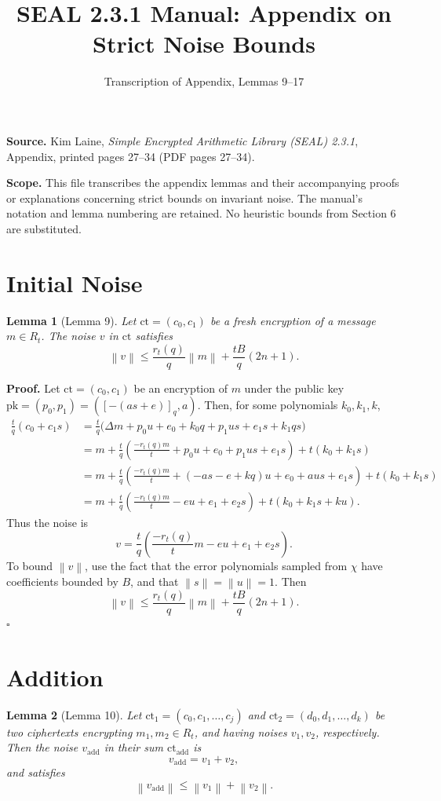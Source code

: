 \documentclass[11pt]{article}
\title{SEAL 2.3.1 Manual: Appendix on Strict Noise Bounds}
\author{Transcription of Appendix, Lemmas 9--17}
\date{}
\newtheorem{lemma}{Lemma}
\newcommand{\norm}[1]{\left\lVert #1\right\rVert}
\newcommand{\ct}{\mathrm{ct}}
\newcommand{\ctadd}{\mathrm{ct}_{\mathrm{add}}}
\newcommand{\vadd}{v_{\mathrm{add}}}
\begin{document}
\maketitle

\textbf{Source.} Kim Laine, \emph{Simple Encrypted Arithmetic Library (SEAL) 2.3.1},
Appendix, printed pages 27--34 (PDF pages 27--34).

\textbf{Scope.} This file transcribes the appendix lemmas and their accompanying
proofs or explanations concerning strict bounds on invariant noise. The
manual's notation and lemma numbering are retained. No heuristic bounds from
Section 6 are substituted.

\section*{Initial Noise}

\begin{lemma}[Lemma 9]
Let $\ct=(c_0,c_1)$ be a fresh encryption of a message $m\in R_t$.
The noise $v$ in $\ct$ satisfies
\[
  \norm{v}
  \leq \frac{r_t(q)}{q}\norm{m}
       +\frac{tB}{q}(2n+1).
\]
\end{lemma}

\textbf{Proof.}
Let $\ct=(c_0,c_1)$ be an encryption of $m$ under the public key
$\mathrm{pk}=(p_0,p_1)=([-(as+e)]_q,a)$. Then, for some polynomials
$k_0,k_1,k$,
\begin{align*}
\frac{t}{q}(c_0+c_1s)
&=\frac{t}{q}
  \bigl(\Delta m+p_0u+e_0+k_0q+p_1us+e_1s+k_1qs\bigr)\\
&=m+\frac{t}{q}
  \left(\frac{-r_t(q)m}{t}+p_0u+e_0+p_1us+e_1s\right)
  +t(k_0+k_1s)\\
&=m+\frac{t}{q}
  \left(\frac{-r_t(q)m}{t}+(-as-e+kq)u+e_0+aus+e_1s\right)
  +t(k_0+k_1s)\\
&=m+\frac{t}{q}
  \left(\frac{-r_t(q)m}{t}-eu+e_1+e_2s\right)
  +t(k_0+k_1s+ku).
\end{align*}
Thus the noise is
\[
  v=\frac{t}{q}
  \left(\frac{-r_t(q)}{t}m-eu+e_1+e_2s\right).
\]
To bound $\norm{v}$, use the fact that the error polynomials sampled from
$\chi$ have coefficients bounded by $B$, and that $\norm{s}=\norm{u}=1$.
Then
\[
  \norm{v}\leq \frac{r_t(q)}{q}\norm{m}
                  +\frac{tB}{q}(2n+1).
\]
\hfill$\square$

\section*{Addition}

\begin{lemma}[Lemma 10]
Let $\ct_1=(c_0,c_1,\ldots,c_j)$ and
$\ct_2=(d_0,d_1,\ldots,d_k)$ be two ciphertexts encrypting
$m_1,m_2\in R_t$, and having noises $v_1,v_2$, respectively.
Then the noise $\vadd$ in their sum $\ctadd$ is
\[
  \vadd=v_1+v_2,
\]
and satisfies
\[
  \norm{\vadd}\leq \norm{v_1}+\norm{v_2}.
\]
\end{lemma}
\end{document}
